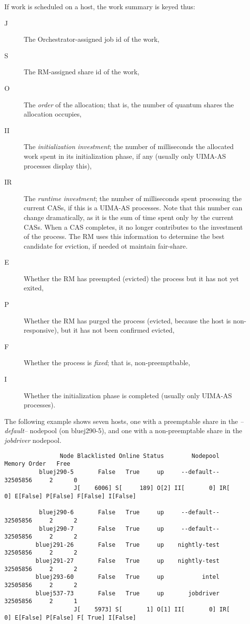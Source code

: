     If work is scheduled on a host, the work summary is keyed thus:
    \begin{description}
      \item[J] The Orchestrator-assigned job id of the work,
      \item[S] The RM-assigned share id of the work,
      \item[O] The {\em order} of the allocation; that is, the number of quantum shares the allocation occupies,
      \item[II] The {\em initialization investment}; the number of milliseconds the allocated work spent in its
        initialization phase, if any (usually only UIMA-AS processes display this),
      \item[IR] The {\em runtime investment}; the number of milliseconds spent processing the current CASs, if this
        is a UIMA-AS processes.  Note that this number can change dramatically, as it is the sum of time spent only
        by the current CASs.  When a CAS completes, it no longer contributes to the investment of the process.  The RM
        uses this information to determine the best candidate for eviction, if needed ot maintain fair-share.
      \item[E] Whether the RM has preempted (evicted) the process but it has not yet exited,
      \item[P] Whether the RM has purged the process (evicted, because the host is non-responsive), but it has not
        been confirmed evicted,
      \item[F] Whether the process is {\em fixed}; that is, non-preemptbable,
      \item[I] Whether the initialization phase is completed (usually only UIMA-AS processes).
    \end{description}

    The following example shows seven hosts, one with a preemptable share in the {\em --default--}
    nodepool (on bluej290-5), and one with a non-preemptable share in the {\em jobdriver} nodepool.
\begin{verbatim}
                Node Blacklisted Online Status        Nodepool     Memory Order   Free
          bluej290-5       False   True     up     --default--   32505856     2      0
                    J[    6006] S[     189] O[2] II[       0] IR[       0] E[False] P[False] F[False] I[False]

          bluej290-6       False   True     up     --default--   32505856     2      2
          bluej290-7       False   True     up     --default--   32505856     2      2
         bluej291-26       False   True     up    nightly-test   32505856     2      2
         bluej291-27       False   True     up    nightly-test   32505856     2      2
         bluej293-60       False   True     up           intel   32505856     2      2
         bluej537-73       False   True     up       jobdriver   32505856     2      1
                    J[    5973] S[       1] O[1] II[       0] IR[       0] E[False] P[False] F[ True] I[False]


\end{verbatim}


